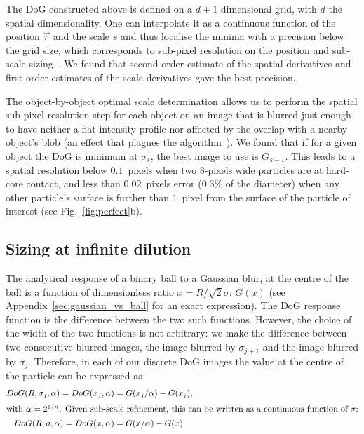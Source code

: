 \documentclass[8.5pt,twoside,twocolumn]{article}
\begin{document}
The DoG constructed above is defined on a $d+1$ dimensional grid, with $d$ the spatial dimensionality. One can interpolate it as a continuous function of the position $\vec{r}$ and the scale $s$ and thus localise the minima with a precision below the grid size, which corresponds to sub-pixel resolution on the position and sub-scale sizing~\citep{Lowe2004}. We found that second order estimate of the spatial derivatives and first order estimates of the scale derivatives gave the best precision.

The object-by-object optimal scale determination allows us to perform the spatial sub-pixel resolution step for each object on an image that is blurred just enough to have neither a flat intensity profile nor affected by the overlap with a nearby object's blob (an effect that plagues the \citet{Crocker1996} algorithm~\cite{Jenkins2008}). We found that if for a given object the DoG is minimum at $\sigma_s$, the best image to use is $G_{s-1}$. This leads to a spatial resolution below $0.1$~pixels when two $8$-pixels wide particles are at hard-core contact, and less than $0.02$~pixels error ($0.3\%$ of the diameter) when any other particle's surface is further than $1$~pixel from the surface of the particle of interest (see Fig.~\ref{fig:perfect}b).

\subsection{Sizing at infinite dilution}
\label{sec:dilute}
The analytical response of a binary ball to a Gaussian blur, at the centre of the ball is a function of dimensionless ratio $x=R/\sqrt{2}\sigma$: $G(x)$ (see Appendix~\ref{sec:gaussian_vs_ball} for an exact expression). The DoG response function is the difference between the two such functions. However, the choice of the width of the two functions is not arbitrary: we make the difference between two consecutive blurred images, the image blurred by $\sigma_{j+1}$ and the image blurred by $\sigma_j$. Therefore, in each of our discrete DoG images the value at the centre of the particle can be expressed as
\begin{align}
DoG(R,\sigma_j, \alpha) = DoG(x_j, \alpha) &= G(x_j/\alpha) - G(x_j),\\
\intertext{with $\alpha=2^{1/n}$. Given sub-scale refinement, this can be written as a continuous function of $\sigma$:}
DoG(R,\sigma, \alpha) = DoG(x, \alpha) &= G(x/\alpha) - G(x).
\end{align}
\end{document}
